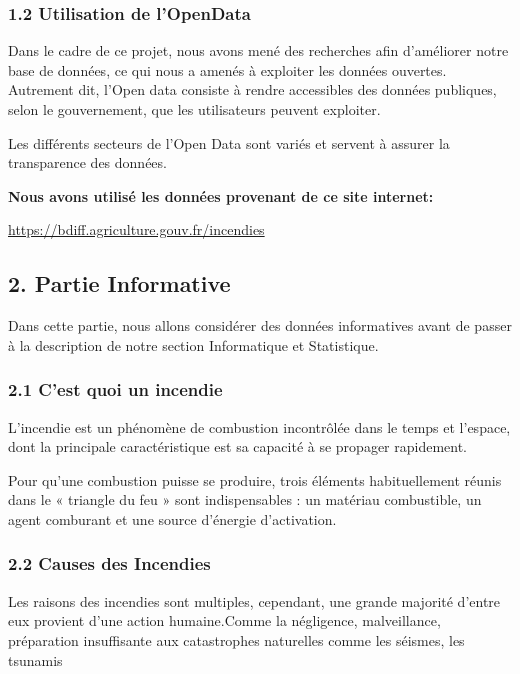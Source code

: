 \documentclass[
]{article}
\begin{document}
\subsubsection{1.2 Utilisation de
l'OpenData}\label{utilisation-de-lopendata}

Dans le cadre de ce projet, nous avons mené des recherches afin
d'améliorer notre base de données, ce qui nous a amenés à exploiter les
données ouvertes. Autrement dit, l'Open data consiste à rendre
accessibles des données publiques, selon le gouvernement, que les
utilisateurs peuvent exploiter.

Les différents secteurs de l'Open Data sont variés et servent à assurer
la transparence des données.

\textbf{Nous avons utilisé les données provenant de ce site internet:}

\url{https://bdiff.agriculture.gouv.fr/incendies}

\subsection{2. Partie Informative}\label{partie-informative}

Dans cette partie, nous allons considérer des données informatives avant
de passer à la description de notre section Informatique et Statistique.

\subsubsection{2.1 C'est quoi un incendie}\label{cest-quoi-un-incendie}

L'incendie est un phénomène de combustion incontrôlée dans le temps et
l'espace, dont la principale caractéristique est sa capacité à se
propager rapidement.

Pour qu'une combustion puisse se produire, trois éléments habituellement
réunis dans le « triangle du feu » sont indispensables : un matériau
combustible, un agent comburant et une source d'énergie d'activation.

\subsubsection{2.2 Causes des Incendies}\label{causes-des-incendies}

Les raisons des incendies sont multiples, cependant, une grande majorité
d'entre eux provient d'une action humaine.Comme la négligence,
malveillance, préparation insuffisante aux catastrophes naturelles comme
les séismes, les tsunamis
\end{document}
